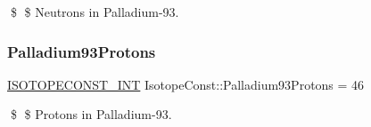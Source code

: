 \$ \$ Neutrons in Palladium-\/93. \mbox{\label{group___isotope_const-_palladium-_pd93_ga6ad8e441a9bb8b9d152a0adb295f9fc2}} 
\subsubsection{\texorpdfstring{Palladium93\+Protons}{Palladium93Protons}}
{\footnotesize\ttfamily \mbox{\hyperlink{group___isotope_const-_macros_ga5f18360b3e99483a35c32d789e62621c}{I\+S\+O\+T\+O\+P\+E\+C\+O\+N\+S\+T\+\_\+\+I\+NT}} Isotope\+Const\+::\+Palladium93\+Protons = 46}

\$ \$ Protons in Palladium-\/93. 